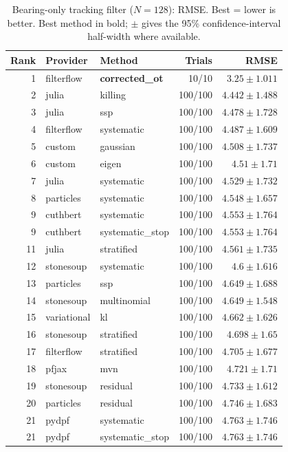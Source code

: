 \begin{table}[!htbp]
\centering
\small
\caption{Bearing-only tracking filter ($N=128$): RMSE. Best = lower is better. Best method in bold; $\pm$ gives the 95\% confidence-interval half-width where available.}
\label{tab:bearing-only-tracking-filter-rmse}
\begin{tabular}{rllrr}
\toprule
Rank & Provider & Method & Trials & RMSE \\
\midrule
1 & filterflow & \textbf{corrected\_ot} & 10/10 & $\mathbf{3.25 \pm 1.011}$ \\
2 & julia & killing & 100/100 & $4.442 \pm 1.488$ \\
3 & julia & ssp & 100/100 & $4.478 \pm 1.728$ \\
4 & filterflow & systematic & 100/100 & $4.487 \pm 1.609$ \\
5 & custom & gaussian & 100/100 & $4.508 \pm 1.737$ \\
6 & custom & eigen & 100/100 & $4.51 \pm 1.71$ \\
7 & julia & systematic & 100/100 & $4.529 \pm 1.732$ \\
8 & particles & systematic & 100/100 & $4.548 \pm 1.657$ \\
9 & cuthbert & systematic & 100/100 & $4.553 \pm 1.764$ \\
9 & cuthbert & systematic\_stop & 100/100 & $4.553 \pm 1.764$ \\
11 & julia & stratified & 100/100 & $4.561 \pm 1.735$ \\
12 & stonesoup & systematic & 100/100 & $4.6 \pm 1.616$ \\
13 & particles & ssp & 100/100 & $4.649 \pm 1.688$ \\
14 & stonesoup & multinomial & 100/100 & $4.649 \pm 1.548$ \\
15 & variational & kl & 100/100 & $4.662 \pm 1.626$ \\
16 & stonesoup & stratified & 100/100 & $4.698 \pm 1.65$ \\
17 & filterflow & stratified & 100/100 & $4.705 \pm 1.677$ \\
18 & pfjax & mvn & 100/100 & $4.721 \pm 1.71$ \\
19 & stonesoup & residual & 100/100 & $4.733 \pm 1.612$ \\
20 & particles & residual & 100/100 & $4.746 \pm 1.683$ \\
21 & pydpf & systematic & 100/100 & $4.763 \pm 1.746$ \\
21 & pydpf & systematic\_stop & 100/100 & $4.763 \pm 1.746$ \\

\end{tabular}
\end{table}
